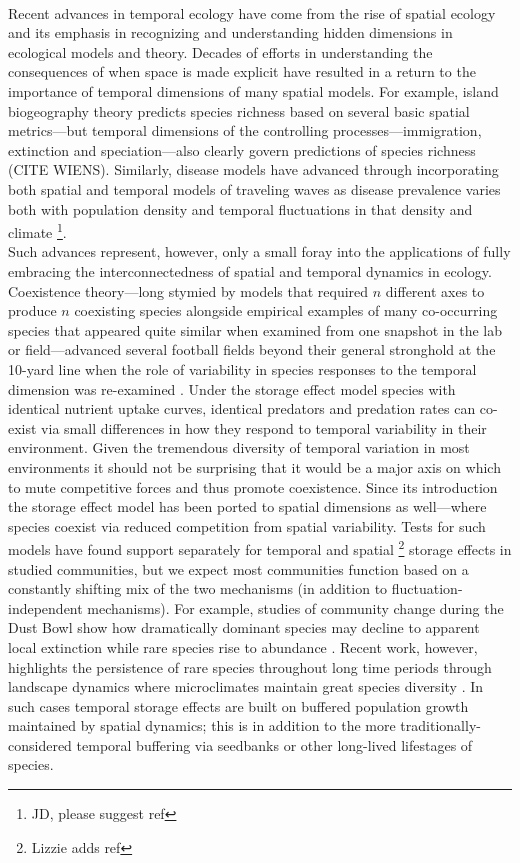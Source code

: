 \documentclass[11pt,a4paper,oneside]{article}
\begin{document}
\\
Recent advances in temporal ecology have come from the rise of spatial ecology and its emphasis in recognizing and understanding hidden dimensions in ecological models and theory. Decades of efforts in understanding the consequences of when space is made explicit have resulted in a return to the importance of temporal dimensions of many spatial models. For example, island biogeography theory predicts species richness based on several basic spatial metrics---but temporal dimensions of the controlling processes---immigration, extinction and speciation---also clearly govern predictions of species richness (CITE WIENS). Similarly, disease models have advanced through incorporating both spatial and temporal models of traveling waves \citep{Grenfell:2001ox} as disease prevalence varies both with population density and temporal fluctuations in that density \citep{Grenfell:2001ox} and climate \footnote{JD, please suggest ref}. \\

Such advances represent, however, only a small foray into the applications of fully embracing the interconnectedness of spatial and temporal dynamics in ecology. Coexistence theory---long stymied by models that required \(n\) different axes to produce \(n\) coexisting species alongside empirical examples of many co-occurring species that appeared quite similar when examined from one snapshot in the lab or field---advanced several football fields beyond their general stronghold at the 10-yard line when the role of variability in species responses to the temporal dimension was re-examined \citep{Chesson:1997dz}. Under the storage effect model \citep{Chesson:1997dz} species with identical nutrient uptake curves, identical predators and predation rates can co-exist via small differences in how they respond to temporal variability in their environment. Given the tremendous diversity of temporal variation in most environments it should not be surprising that it would be a major axis on which to mute competitive forces and thus promote coexistence. Since its introduction the storage effect model has been ported to spatial dimensions as well---where species coexist via reduced competition from spatial variability. Tests for such models have found support separately for temporal \citep{Angert:2009} and spatial \footnote{Lizzie adds ref} storage effects in studied communities, but we expect most communities function based on a constantly shifting mix of the two mechanisms (in addition to fluctuation-independent mechanisms). For example, studies of community change during the Dust Bowl show how dramatically dominant species may decline to apparent local extinction while rare species rise to abundance \citep{Weaver1936}. Recent work, however, highlights the persistence of rare species throughout long time periods through landscape dynamics where microclimates maintain great species diversity \cite{Craine2012}. In such cases temporal storage effects are built on buffered population growth maintained by spatial dynamics; this is in addition to the more traditionally-considered temporal buffering via seedbanks or other long-lived lifestages of species. \\
\end{document}
